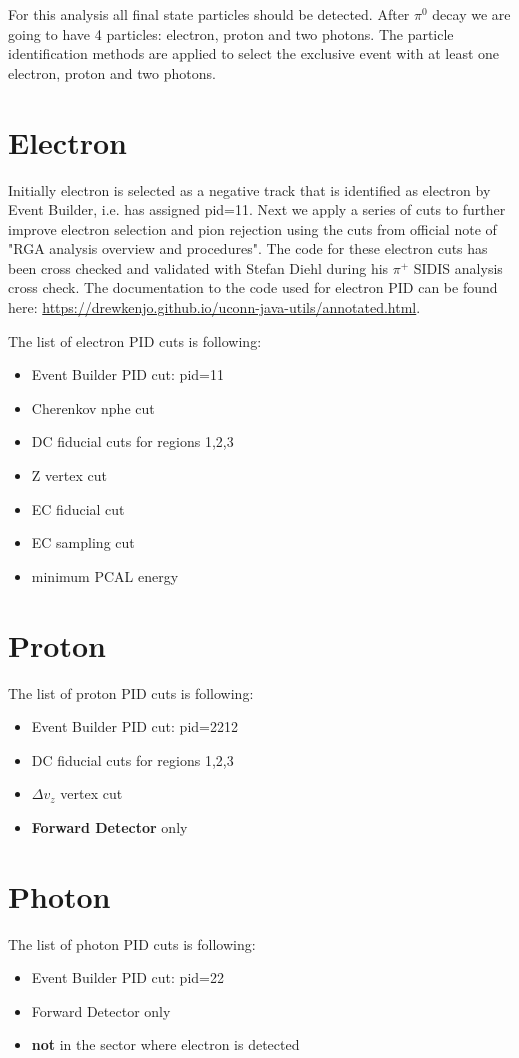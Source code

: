 
For this analysis all final state particles should be detected.
After $\pi^0$ decay we are going to have 4 particles: electron, proton and two photons.
The particle identification methods are applied to select the exclusive event with at least one electron, proton and two photons.

\section{Electron}
Initially electron is selected as a negative track that is identified as electron by Event Builder, i.e. has assigned pid=11.
Next we apply a series of cuts to further improve electron selection and pion rejection using the cuts from official note of "RGA analysis overview and procedures".
The code for these electron cuts has been cross checked and validated with Stefan Diehl during his $\pi^+$ SIDIS analysis cross check.
The documentation to the code used for electron PID can be found here: \href{https://drewkenjo.github.io/uconn-java-utils/annotated.html}{https://drewkenjo.github.io/uconn-java-utils/annotated.html}.

The list of electron PID cuts is following:
\begin{itemize}
	\item Event Builder PID cut: pid=11
	\item Cherenkov nphe cut
	\item DC fiducial cuts for regions 1,2,3
	\item Z vertex cut
	\item EC fiducial cut
	\item EC sampling cut
	\item minimum PCAL energy
\end{itemize}


\section{Proton}
The list of proton PID cuts is following:
\begin{itemize}
	\item Event Builder PID cut: pid=2212
	\item DC fiducial cuts for regions 1,2,3
	\item $\Delta v_z$ vertex cut
	\item {\bfseries Forward Detector} only
\end{itemize}

\section{Photon}
The list of photon PID cuts is following:
\begin{itemize}
	\item Event Builder PID cut: pid=22
	\item Forward Detector only
	\item {\bfseries not} in the sector where electron is detected
\end{itemize}


